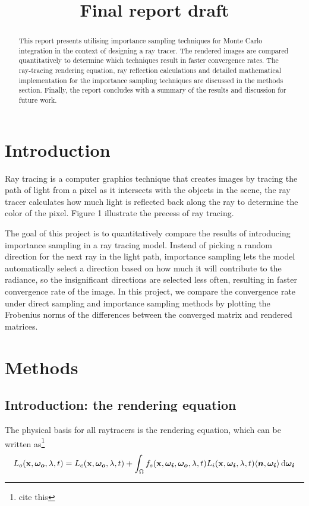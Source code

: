 \documentclass[12pt]{article}
\title{Final report draft}
\DeclarePairedDelimiter\ip{\langle }{\rangle}
\begin{document}
\maketitle
\begin{abstract}
This report presents utilising importance sampling techniques for Monte Carlo integration in the context of designing a ray tracer. The rendered images are compared quantitatively to determine which techniques result in faster convergence rates. The ray-tracing rendering equation, ray reflection calculations and detailed mathematical implementation for the importance sampling techniques are discussed in the methods section. Finally, the report concludes with a summary of the results and discussion for future work.
\end{abstract}

\section{Introduction}
Ray tracing is a computer graphics technique that creates images by tracing the path of light from a pixel as it intersects with the objects in the scene, the ray tracer calculates how much light is reflected back along the ray to determine the color of the pixel. Figure 1 illustrate the precess of ray tracing. \newline

The goal of this project is to quantitatively compare the results of introducing importance sampling in a ray tracing model. Instead of picking a random direction for the next ray in the light path, importance sampling lets the model  automatically select a direction based on how much it will contribute to the radiance, so the insignificant directions are selected less often, resulting in faster convergence rate of the image. In this project, we compare the convergence rate under direct sampling and importance sampling methods by plotting the Frobenius norms of the differences between the converged matrix and rendered matrices.\newline
    
\section{Methods}
\subsection{Introduction: the rendering equation}
The physical basis for all raytracers is the rendering equation, which can be written as\footnote{cite this}
\[L_{o}(\mathbf x, \bm {\omega_{o}}, \lambda, t) = L_{e}(\mathbf x, \bm{\omega_o}, \lambda, t) + \int_\Omega f_s(\mathbf x, \bm{\omega_i}, \bm{\omega_o}, \lambda, t)L_i(\mathbf x, \bm{\omega_i}, \lambda, t)\ip{\bm n, \bm{\omega_i}} \dif \bm{\omega_i}\]
\end{document}
